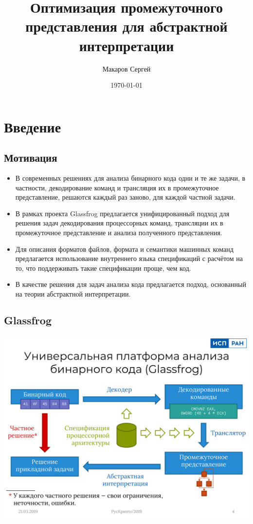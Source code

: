\documentclass[11pt]{article}
\author{Макаров Сергей}
\date{\today}
\title{Оптимизация промежуточного представления для абстрактной интерпретации}
\begin{document}
\maketitle

\section{Введение}
\label{sec:orgc8daa55}
\subsection{Мотивация}
\label{sec:org6eaf7f6}
\begin{itemize}
\item В современных решениях для анализа бинарного кода одни и те же задачи, в частности, декодирование команд и трансляция их в промежуточное представление, решаются каждый раз заново, для каждой частной задачи.
\item В рамках проекта Glassfrog предлагается унифицированный подход для решения задач декодирования процессорных команд, трансляции их в промежуточное представление и анализа полученного представления.
\item Для описания форматов файлов, формата и семантики машинных команд предлагается использование внутреннего языка спецификаций с расчётом на то, что поддерживать такие спецификации проще, чем код.
\item В качестве решения для задач анализа кода предлагается подход, основанный на теории абстрактной интерпретации.
\end{itemize}
\subsection{Glassfrog}
\label{sec:orgd93d2f9}
\begin{center}
\includegraphics[width=.9\linewidth]{./glassfrog.png}
\end{center}
\end{document}
